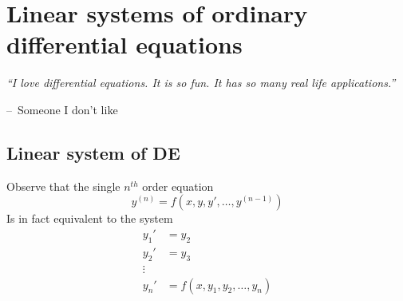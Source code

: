 \documentclass[oneside,11pt,pdftex,final]{book}%
\makeatletter
\numberwithin{equation}{section}
\newenvironment{chapquote}[2][2em]
{\setlength{\@tempdima}{#1}%
	\def\chapquote@author{#2}%
	\parshape 1 \@tempdima \dimexpr\textwidth-2\@tempdima\relax%
	\itshape}
{\par\normalfont\hfill--\ \chapquote@author\hspace*{\@tempdima}\par\bigskip}
\newtheorem{example}[theorem]{Example}
\numberwithin{section}{chapter}
\numberwithin{equation}{chapter}
\makeatother
\begin{document}
\chapter{Linear systems of ordinary differential equations}
\begin{chapquote}{Someone I don't like}
	``I love differential equations. It is so fun. It has so many real life applications.''
\end{chapquote}

\section{Linear system of DE}
%

Observe that the single $ n^{th} $ order equation \begin{equation}\label{def:largeeq}
	y^{(n)}=f(x,y,y',\dots,y^{(n-1)}) 
\end{equation} 
Is in fact equivalent to the system 
\begin{align*}
	y_1'&=y_2\\
	y_2'&=y_3\\
	\vdots &\\
	y_n'&=f(x,y_1,y_2,\dots,y_n)
\end{align*}
\end{document}
